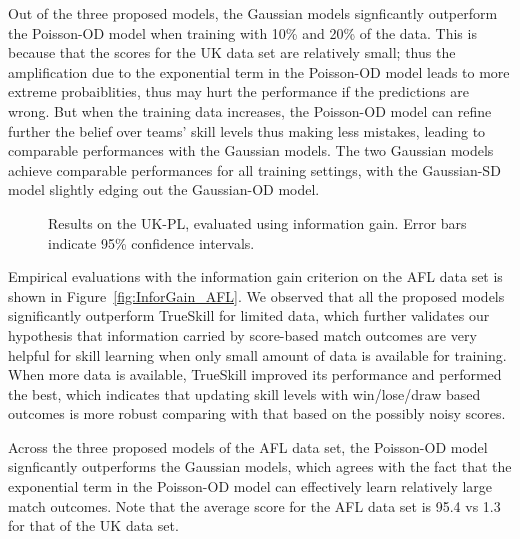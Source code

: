Out of the three proposed models, the Gaussian models signficantly outperform the Poisson-OD model when training with 10\% and 20\% of the data. This is because that the scores for the UK data set are relatively small; thus the amplification due to the exponential term in the Poisson-OD model leads to more extreme probaiblities, thus may hurt the performance if the predictions are wrong. But when the training data increases, the Poisson-OD model can refine further the belief over teams' skill levels thus making less mistakes, leading to comparable performances with the Gaussian models. The two Gaussian models achieve comparable performances for all training settings, with the Gaussian-SD model slightly edging out the Gaussian-OD model. 


\begin{center}
\begin{figure*}[htbp!]
 \centering
\caption{\small Results on the UK-PL, evaluated
using information gain. Error bars indicate
95\% confidence intervals.}
\label{fig:InforGain_UK}
\end{figure*}
\end{center}

Empirical evaluations with the information gain criterion on the AFL data set is shown in Figure~\ref{fig:InforGain_AFL}. We observed that all the proposed models significantly outperform TrueSkill for limited data, which further validates our hypothesis that information carried by score-based match outcomes are very helpful for skill learning when only small amount of data is available for training. When more data is available, TrueSkill improved its performance and performed the best, which indicates that updating skill levels with win/lose/draw based outcomes is more robust comparing with that based on the possibly noisy scores. 

Across the three proposed models of the AFL data set, the Poisson-OD model signficantly outperforms the Gaussian models, which agrees with the fact that the exponential term in the Poisson-OD model can effectively learn relatively large match outcomes. Note that the average score for the AFL data set is 95.4 vs 1.3 for that of the UK data set. 

